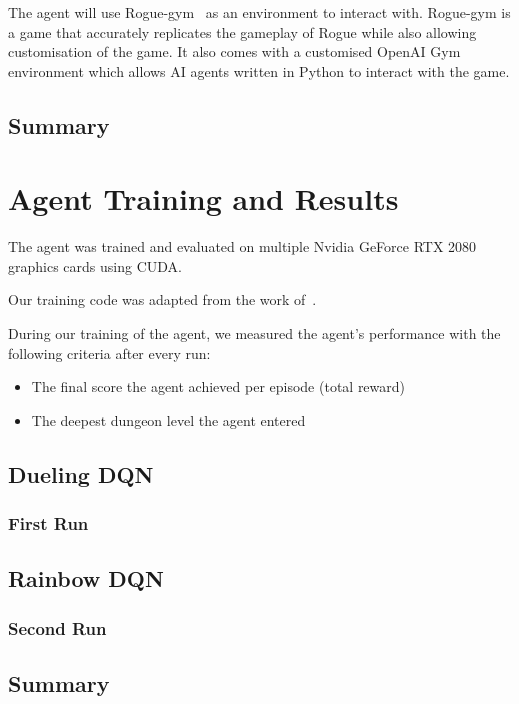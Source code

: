 \documentclass[12pt,a4paper]{article}
\begin{document}
    The agent will use Rogue-gym~\citep{kanagawa19} as an environment to interact with.
    Rogue-gym is a game that accurately replicates the gameplay of Rogue while also allowing customisation of the game.
    It also comes with a customised OpenAI Gym environment which allows AI agents written in Python to interact with the game.

    \subsection{Summary}\label{subsec:summary2} %

    \section{Agent Training and Results}\label{sec:agent-training-and-results}  %
    The agent was trained and evaluated on multiple Nvidia GeForce RTX 2080 graphics cards using CUDA.

    Our training code was adapted from the work of~\citet{sebtheiler}.

    During our training of the agent, we measured the agent's performance with the following criteria after every run:

    \begin{itemize}
        \item The final score the agent achieved per episode (total reward)
        \item The deepest dungeon level the agent entered
    \end{itemize}

    \subsection{Dueling DQN}\label{subsec:dueling-dqn}
    \subsubsection{First Run}

    \subsection{Rainbow DQN}\label{subsec:rainbow-dqn}
    \subsubsection{Second Run}

    \subsection{Summary}\label{subsec:summary}
\end{document}
